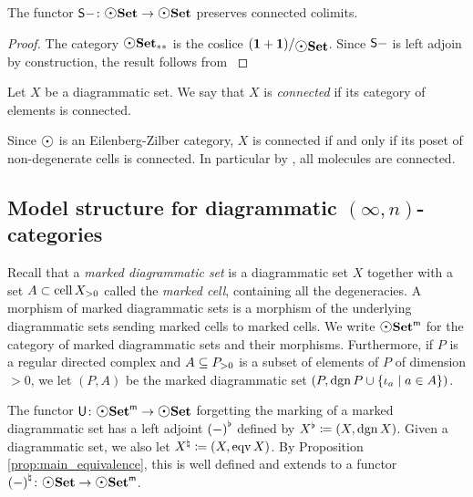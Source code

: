\begin{prop} \label{prop:suspension_of_dgmSet}
    The functor \( \sus{-} \colon \dgmSet \to \dgmSet \) preserves connected colimits.    
\end{prop}
\begin{proof}
    The category \( \bpt{\dgmSet} \) is the coslice \( \slice{(\pt + \pt)}{\dgmSet} \).
    Since \( \sus{-} \) is left adjoin by construction, the result follows from \cite[Proposition 3.3.8]{riehl2019context}
\end{proof}

\begin{dfn} 
    Let \( X \) be a diagrammatic set. 
    We say that \( X \) is \emph{connected} if its category of elements is connected.
\end{dfn}

\begin{rmk} \label{rmk:ez_connected}
    Since \( \atom \) is an Eilenberg-Zilber category, \( X \) is connected if and only if its poset of non-degenerate cells is connected.
    In particular by \cite[Lemma 3.3.13]{hadzihasanovic2024combinatorics}, all molecules are connected.
\end{rmk}

\subsection{Model structure for diagrammatic \texorpdfstring{$(\infty, n)$}{(∞, n)}-categories}


Recall that a \emph{marked diagrammatic set} is a diagrammatic set \( X \) together with a set \( A \subset \gr{> 0}{\cell X} \) called the \emph{marked cell}, containing all the degeneracies. 
A morphism of marked diagrammatic sets is a morphism of the underlying diagrammatic sets sending marked cells to marked cells.
We write \( \mdgmSet \) for the category of marked diagrammatic sets and their morphisms. 
Furthermore, if \( P \) is a regular directed complex and \( A \subseteq \gr{> 0}{P} \) is a subset of elements of \( P \) of dimension \( > 0 \), we let \( (P, A) \) be the marked diagrammatic set \( (P, \dgn P \cup \set{\mapel{a} \mid a \in A}) \).

\begin{dfn}
    The functor \( \fun{U} \colon \mdgmSet \to \dgmSet \) forgetting the marking of a marked diagrammatic set has a left adjoint \( \minmark{(-)} \) defined by \( \minmark{X} \eqdef (X, \dgn X) \).
    Given a diagrammatic set, we also let \( \natmark{X} \eqdef (X, \eqv X) \).
    By Proposition \ref{prop:main_equivalence}, this is well defined and extends to a functor \( \natmark{(-)} \colon \dgmSet \to \mdgmSet \). 
\end{dfn}

